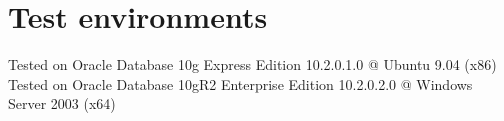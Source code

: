 \section{Test environments}
Tested on Oracle Database 10g Express Edition 10.2.0.1.0 @ Ubuntu 9.04 (x86)
Tested on Oracle Database 10gR2 Enterprise Edition 10.2.0.2.0 @ Windows Server 2003 (x64)


